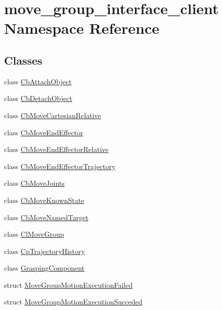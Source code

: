 \hypertarget{namespacemove__group__interface__client}{}\section{move\+\_\+group\+\_\+interface\+\_\+client Namespace Reference}
\label{namespacemove__group__interface__client}
\subsection*{Classes}
\begin{DoxyCompactItemize}
\item 
class \hyperlink{classmove__group__interface__client_1_1CbAttachObject}{Cb\+Attach\+Object}
\item 
class \hyperlink{classmove__group__interface__client_1_1CbDetachObject}{Cb\+Detach\+Object}
\item 
class \hyperlink{classmove__group__interface__client_1_1CbMoveCartesianRelative}{Cb\+Move\+Cartesian\+Relative}
\item 
class \hyperlink{classmove__group__interface__client_1_1CbMoveEndEffector}{Cb\+Move\+End\+Effector}
\item 
class \hyperlink{classmove__group__interface__client_1_1CbMoveEndEffectorRelative}{Cb\+Move\+End\+Effector\+Relative}
\item 
class \hyperlink{classmove__group__interface__client_1_1CbMoveEndEffectorTrajectory}{Cb\+Move\+End\+Effector\+Trajectory}
\item 
class \hyperlink{classmove__group__interface__client_1_1CbMoveJoints}{Cb\+Move\+Joints}
\item 
class \hyperlink{classmove__group__interface__client_1_1CbMoveKnownState}{Cb\+Move\+Known\+State}
\item 
class \hyperlink{classmove__group__interface__client_1_1CbMoveNamedTarget}{Cb\+Move\+Named\+Target}
\item 
class \hyperlink{classmove__group__interface__client_1_1ClMoveGroup}{Cl\+Move\+Group}
\item 
class \hyperlink{classmove__group__interface__client_1_1CpTrajectoryHistory}{Cp\+Trajectory\+History}
\item 
class \hyperlink{classmove__group__interface__client_1_1GraspingComponent}{Grasping\+Component}
\item 
struct \hyperlink{structmove__group__interface__client_1_1MoveGroupMotionExecutionFailed}{Move\+Group\+Motion\+Execution\+Failed}
\item 
struct \hyperlink{structmove__group__interface__client_1_1MoveGroupMotionExecutionSucceded}{Move\+Group\+Motion\+Execution\+Succeded}
\end{DoxyCompactItemize}

